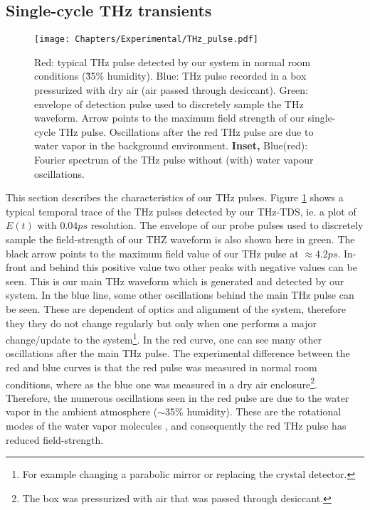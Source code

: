 \subsection{Single-cycle THz transients} %
\begin{figure}[h!]\centering
\texttt{[image: Chapters/Experimental/THz\_pulse.pdf]} %
\caption{Red: typical THz pulse detected by our system in normal room conditions (\~35\% humidity). Blue: THz pulse recorded in a box pressurized with dry air (air passed through desiccant). Green: envelope of detection pulse used to discretely sample the THz waveform. Arrow points to the maximum  field strength of our single-cycle THz pulse. Oscillations after the red THz pulse are due to water vapor in the background environment. \textbf{Inset,} Blue(red): Fourier spectrum of the THz pulse without (with) water vapour oscillations.}%
\label{fig:THz_pulse}
\end{figure}

This section describes the characteristics of our THz pulses. Figure \ref{fig:THz_pulse} shows a typical temporal trace of the THz pulses detected by our THz-TDS, ie. a plot of $E(t)$ with $0.04ps$ resolution. The envelope of our probe pulses used to discretely sample the field-strength of our THZ waveform is also shown here in green. The black arrow points to the maximum field value of our THz pulse at $\approx 4.2ps$. In-front and behind this positive value two other peaks with negative values can be seen. This is our main THz waveform which is generated and detected by our system. In the blue line, some other oscillations behind the main THz pulse can be seen. These are dependent of optics and alignment of the system, therefore they they do not change regularly but only when one performs a major change/update to the system\footnote{For example changing a parabolic mirror or replacing the crystal detector.}. In the red curve, one can see many other oscillations after the main THz pulse. The experimental difference between the red and blue curves is that the red pulse was measured in normal room conditions, where as the blue one was measured in a dry air enclosure\footnote{The box was pressurized with air that was passed through desiccant.}. Therefore, the numerous oscillations seen in the red pulse are due to the water vapor in the ambient atmosphere ($\sim$35\% humidity). These are the rotational modes of the water vapor molecules \cite{THz_watervapor}, and consequently the red THz pulse has reduced field-strength. 


